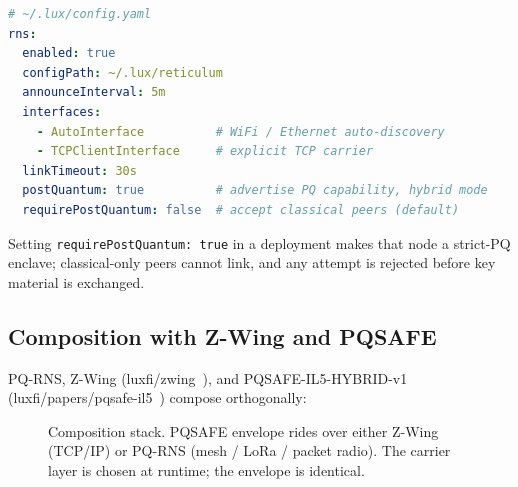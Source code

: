 \documentclass[11pt,a4paper]{article}
\begin{document}
\begin{lstlisting}[language=yaml,caption={luxfi/node RNS configuration.}]
# ~/.lux/config.yaml
rns:
  enabled: true
  configPath: ~/.lux/reticulum
  announceInterval: 5m
  interfaces:
    - AutoInterface          # WiFi / Ethernet auto-discovery
    - TCPClientInterface     # explicit TCP carrier
  linkTimeout: 30s
  postQuantum: true          # advertise PQ capability, hybrid mode
  requirePostQuantum: false  # accept classical peers (default)
\end{lstlisting}

Setting \texttt{requirePostQuantum: true} in a deployment makes that
node a strict-PQ enclave; classical-only peers cannot link, and any
attempt is rejected before key material is exchanged.

\subsection{Composition with Z-Wing and PQSAFE}

PQ-RNS, Z-Wing (luxfi/zwing~\cite{luxzwing}), and PQSAFE-IL5-HYBRID-v1
(luxfi/papers/pqsafe-il5~\cite{pqsafe}) compose orthogonally:

\begin{figure}[H]
\centering
{}
\caption{Composition stack. PQSAFE envelope rides over either Z-Wing
(TCP/IP) or PQ-RNS (mesh / LoRa / packet radio). The carrier layer is
chosen at runtime; the envelope is identical.}
\end{figure}
\end{document}
